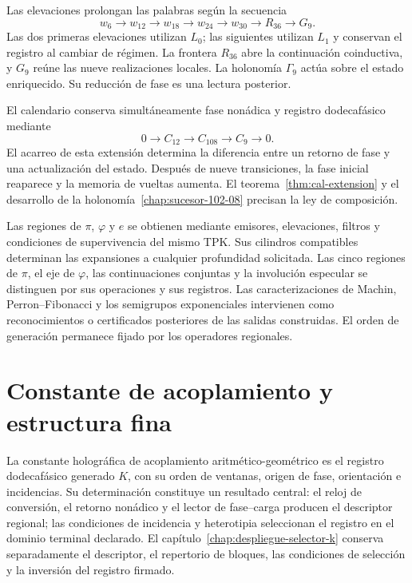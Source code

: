 Las elevaciones prolongan las palabras según la secuencia
\[
 w_6\longrightarrow w_{12}\longrightarrow w_{18}
 \longrightarrow w_{24}\longrightarrow w_{30}
 \longrightarrow R_{36}\longrightarrow G_9.
\]
Las dos primeras elevaciones utilizan \(L_0\); las siguientes utilizan
\(L_1\) y conservan el registro al cambiar de régimen. La frontera
\(R_{36}\) abre la continuación coinductiva, y \(G_9\) reúne las
nueve realizaciones locales. La holonomía \(\Gamma_9\) actúa sobre
el estado enriquecido. Su reducción de fase es una lectura posterior.

El calendario conserva simultáneamente fase nonádica y registro
dodecafásico mediante
\[
 0\longrightarrow C_{12}\longrightarrow C_{108}
 \longrightarrow C_9\longrightarrow0.
\]
El acarreo de esta extensión determina la diferencia entre un retorno de
fase y una actualización del estado. Después de nueve transiciones,
la fase inicial reaparece y la memoria de vueltas aumenta. El
teorema~\ref{thm:cal-extension} y el desarrollo de la
holonomía~\ref{chap:sucesor-102-08} precisan la ley de composición.

Las regiones de \(\pi\), \(\varphi\) y \(e\) se obtienen mediante
emisores, elevaciones, filtros y condiciones de supervivencia del mismo
TPK. Sus cilindros compatibles determinan las expansiones a cualquier
profundidad solicitada. Las cinco regiones de \(\pi\), el eje de
\(\varphi\), las continuaciones conjuntas y la involución especular
se distinguen por sus operaciones y sus registros. Las caracterizaciones
de Machin, Perron--Fibonacci y los semigrupos exponenciales intervienen
como reconocimientos o certificados posteriores de las salidas
construidas. El orden de generación permanece fijado por los operadores
regionales.

\section*{Constante de acoplamiento y estructura fina}

La constante holográfica de acoplamiento aritmético-geométrico es el
registro dodecafásico generado \(K\), con su orden de ventanas, origen
de fase, orientación e incidencias. Su determinación constituye un
resultado central: el reloj de conversión, el retorno nonádico y el
lector de fase--carga producen el descriptor regional; las condiciones
de incidencia y heterotipia seleccionan el registro en el dominio
terminal declarado. El capítulo~\ref{chap:despliegue-selector-k}
conserva separadamente el
descriptor, el repertorio de bloques, las condiciones de selección y
la inversión del registro firmado.

